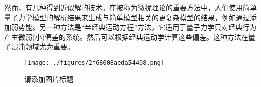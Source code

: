 然而，有几种得到近似解的技术。在被称为微扰理论的重要方法中，人们使用简单量子力学模型的解析结果来生成与简单模型相关的更复杂模型的结果，例如通过添加弱势能。另一种方法是“半经典运动方程”方法，它适用于量子力学只对经典行为产生微弱(小)偏差的系统。然后可以根据经典运动学计算这些偏差。这种方法在量子混沌领域尤为重要。

\begin{figure}[ht]
\centering
\texttt{[image: ./figures/2f68008aeda54408.png]}
\caption{请添加图片标题} \label{fig_LZLX_3}
\end{figure}





